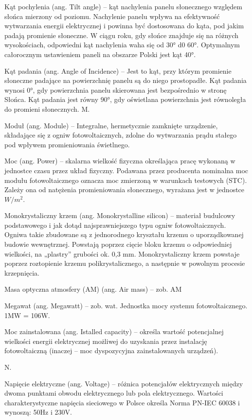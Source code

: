 \documentclass[12pt,a4paper]{article}
\begin{document}
Kąt pochylenia (ang. Tilt angle) – kąt nachylenia panelu słonecznego względem słońca mierzony od poziomu. Nachylenie panelu wpływa na efektywność wytwarzania energii elektrycznej i powinna być dostosowana do kąta, pod jakim padają promienie słoneczne. W ciągu roku, gdy słońce znajduje się na różnych wysokościach, odpowiedni kąt nachylenia waha się od 30° d0 60°. Optymalnym całorocznym ustawieniem paneli na obszarze Polski jest kąt 40°.

Kąt padania (ang. Angle of Incidence) – Jest to kąt, przy którym promienie słoneczne padające na powierzchnię panelu są do niego prostopadłe. Kąt padania wynosi 0°, gdy powierzchnia panelu skierowana jest bezpośrednio w stronę Słońca. Kąt padania jest równy 90°, gdy oświetlana powierzchnia jest równoległa do promieni słonecznych.
M.

Moduł (ang. Module) – Integralne, hermetycznie zamknięte urządzenie, składające się z ogniw fotowoltaicznych, zdolne do wytwarzania prądu stałego pod wpływem promieniowania świetlnego.

Moc (ang. Power) – skalarna wielkość fizyczna określająca pracę wykonaną w jednostce czasu przez układ fizyczny. Podawana przez producenta nominalna moc modułu fotowoltaicznego oznacza moc zmierzoną w warunkach testowych (STC). Zależy ona od natężenia promieniowania słonecznego, wyrażana jest w jednostce ${W/m^{2}}$.

Monokrystaliczny krzem (ang. Monokrystalline silicon) – materiał budulcowy podstawowego i jak dotąd najsprawniejszego typu ogniw fotowoltaicznych. Ogniwa takie zbudowane są z jednorodnego kryształu krzemu o uporządkowanej budowie wewnętrznej. Powstają poprzez cięcie bloku krzemu o odpowiedniej wielkości, na „plastry” grubości ok. 0,3 mm. Monokrystaliczny krzem powstaje poprzez roztopienie krzemu polikrystalicznego, a następnie w powolnym procesie krzepnięcia.

Masa optyczna atmosfery (AM) (ang. Air mass) – zob. AM

Megawat (ang. Megawatt) – zob. wat. Jednostka mocy systemu fotowoltaicznego. 1MW = 106W.

Moc zainstalowana (ang. Istalled capacity) – określa wartość potencjalnej wielkości energii elektrycznej możliwej do uzyskania przez instalację fotowoltaiczną (inaczej – moc dyspozycyjna zainstalowanych urządzeń).

 

N.

Napięcie elektryczne (ang. Voltage) – różnica potencjałów elektrycznych między dwoma punktami obwodu elektrycznego lub pola elektrycznego. Wartości charakterystyczne napięcia sieciowego w Polsce określa Norma  PN-IEC 60038 i wynoszą: 50Hz i 230V.
\end{document}
